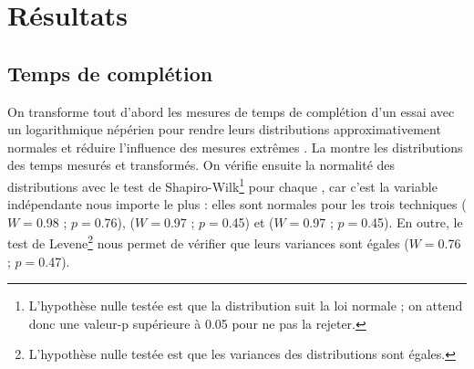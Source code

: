 \section{Résultats}
\label{sec:experiment_results}

\subsection{Temps de complétion}
\label{subsec:experiment_results_time}

On transforme tout d'abord les mesures de temps de complétion d'un essai avec un logarithmique népérien pour rendre leurs distributions approximativement normales et réduire l'influence des mesures extrêmes \citep[Tip 12 (p. 25)]{Dragicevic2016}. La  montre les distributions des temps mesurés et transformés. On vérifie ensuite la normalité des distributions avec le test de Shapiro-Wilk\footnote{L'hypothèse nulle testée est que la distribution suit la loi normale ; on attend donc une valeur-p supérieure à \num{0.05} pour ne pas la rejeter.} \citep{Wobbrock2016} pour chaque , car c'est la variable indépendante nous importe le plus : elles sont normales pour les trois techniques  ($W=$\num{0.98} ; $p=$\num{0.76}),  ($W=$\num{0.97} ; $p=$\num{0.45}) et  ($W=$\num{0.97} ; $p=$\num{0.45}). En outre, le test de Levene\footnote{L'hypothèse nulle testée est que les variances des distributions sont égales.} \citep{Wobbrock2016} nous permet de vérifier que leurs variances sont égales ($W=$\num{0.76} ; $p=$\num{0.47}).


